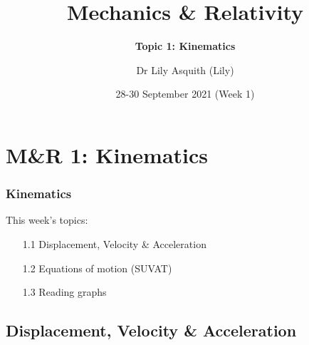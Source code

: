 


% 
\title[ Mechanics \& Relativity]{Mechanics \& Relativity}
\subtitle{\textbf{Topic 1: Kinematics }}
\author[Dr Lily Asquith (Lily)]{ Dr Lily Asquith (Lily)}
\date[28-30 September 2021]{28-30 September 2021 (Week 1)}





\begin{frame}
\titlepage
\end{frame} 

\section{M\&R 1: Kinematics}
\begin{frame}
\frametitle{Kinematics} 
\normalsize

This week's topics:\\[3ex]

\begin{itemize}
\item[1.1] Displacement, Velocity \& Acceleration\\[3ex]
\item[1.2] Equations of motion (SUVAT)\\[3ex]
\item[1.3] Reading graphs\\[3ex]
\end{itemize}
\end{frame} 
 
 
 \subsection{Displacement, Velocity \& Acceleration }

